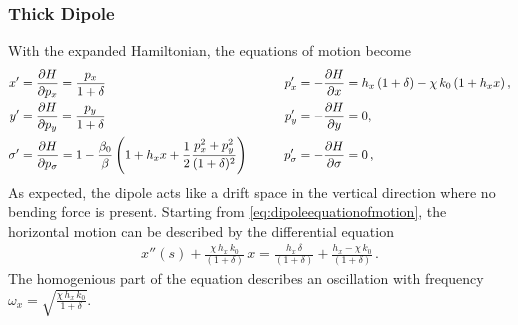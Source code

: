 \subsubsection{Thick Dipole}
With the expanded Hamiltonian, the equations of motion become 
\begin{alignat}{4}
x' &=  \frac{\partial H}{\partial p_x} = \frac{p_x}{1+\delta} \quad \quad \quad \quad &p_x' &= -\frac{\partial H}{\partial x} = h_x \, (1+\delta) - \chi \, k_0 \, (1+h_x x)  \, , \\ \label{eq:dipoleequationofmotion}
y' &= \frac{\partial H}{\partial p_y} = \frac{p_y}{1+\delta} \quad \quad &p_y' &= -\frac{\partial H}{\partial y} = 0 ,  \\
\sigma' &=  \frac{\partial H}{\partial p_\sigma} =  1 - \frac{\beta_0}{\beta} \left( 1+h_x x + \frac{1}{2} \frac{p_x^2 + p_y^2}{(1+\delta)^2} \right) \quad \quad  &p_\sigma' &= -\frac{\partial H}{\partial \sigma} = 0 \, , 
\end{alignat}
As expected, the dipole acts like a drift space in the vertical direction where no bending force is present. Starting from \eqref{eq:dipoleequationofmotion}, the horizontal motion can be described by the differential equation
\begin{align}
x''(s) + \frac{\chi \, h_x \, k_0}{(1+\delta)} \, x = \frac{h_x \, \delta}{(1+\delta)} + \frac{h_x - \chi \, k_0}{(1+\delta)} \, . \label{eq:diffeqdipole}
\end{align}
%
The homogenious part of the equation describes an oscillation with frequency $\omega_x=\sqrt{\frac{\chi \, h_x \, k_0}{1+\delta}}$.



